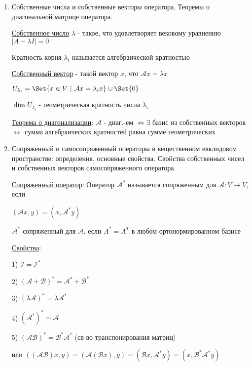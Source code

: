 \documentclass[12pt]{article}
\begin{document}
\begin{enumerate}
        \item Собственные числа и собственные векторы оператора. Теоремы о диагональной матрице оператора.

        \hyperlink{eigenvalue}{Собственное число} $\lambda$ - такое, что удовлетворяет вековому уравнению $|A - \lambda I| = 0$

        Кратность корня $\lambda_i$ называется алгебраической кратностью

        \hyperlink{eigenvector}{Собственный вектор} - такой вектор $x$, что $\mathcal{A}x = \lambda x$

        $U_{\lambda_i} = \Set{x \in V \ | \ \mathcal{A}x = \lambda_i x} \union \Set{0}$

        $\dim U_{\lambda_i}$ - геометрическая кратность числа $\lambda_i$

        \hyperlink{diagonalizedmatrixtheorem}{Теорема о диагонализации}: $\mathcal{A}$ - диаг.-ем $\Longleftrightarrow \exists$ базис из собственных векторов $\Longleftrightarrow$ сумма алгебраических кратностей равна сумме геометрических

        \item Сопряженный и самосопряженный операторы в вещественном евклидовом пространстве: определения, основные свойства. Свойства собственных чисел и собственных векторов самосопряженного оператора.

        \hyperlink{conjugateoperator}{Сопряженный оператор}: Оператор $\mathcal{A}^*$ называется сопряженным для $\mathcal{A} : V \to V$, если

        $(\mathcal{A}x, y) = (x, \mathcal{A}^* y)$

        $\mathcal{A}^*$ сопряженный для $\mathcal{A}$, если $A^* = A^T$ в любом ортонормированном базисе

        \hyperlink{conjugateoperatorproperties}{Свойства}:

        1) $\mathcal{I} = \mathcal{I}^*$

        2) $(\mathcal{A} + \mathcal{B})^* = \mathcal{A}^* + \mathcal{B}^*$

        3) $(\lambda \mathcal{A})^* = \lambda \mathcal{A}^*$

        4) $(\mathcal{A}^*)^* = \mathcal{A}$

        5) $(\mathcal{A}\mathcal{B})^* = \mathcal{B}^* \mathcal{A}^*$ (св-во транспонирования матриц)

        или $((\mathcal{AB})x, y) = (\mathcal{A}(\mathcal{B}x), y) = (\mathcal{B}x, \mathcal{A}^* y) = (x, \mathcal{B}^* \mathcal{A}^* y)$


\end{enumerate}
\end{document}
